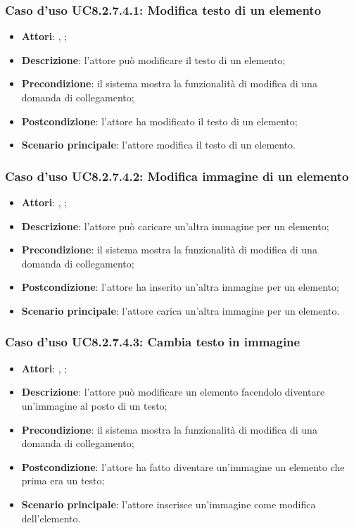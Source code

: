 		\subsubsection{Caso d'uso UC8.2.7.4.1: Modifica testo di un elemento}
		\label{UC8.2.7.4.1}
		\begin{itemize}
			\item \textbf{Attori}: \uau, \uaupro;
			\item \textbf{Descrizione}: l'attore può modificare il testo di un elemento;
			\item \textbf{Precondizione}: il sistema mostra la funzionalità di modifica di una domanda di collegamento; 
			\item \textbf{Postcondizione}: l'attore ha modificato il testo di un elemento;
			\item \textbf{Scenario principale}: l'attore modifica il testo di un elemento.  
		\end{itemize}
		
		\subsubsection{Caso d'uso UC8.2.7.4.2: Modifica immagine di un elemento}
		\label{UC8.2.7.4.2}
		\begin{itemize}
			\item \textbf{Attori}: \uau, \uaupro;
			\item \textbf{Descrizione}: l'attore può caricare un'altra immagine per un elemento;
			\item \textbf{Precondizione}: il sistema mostra la funzionalità di modifica di una domanda di collegamento; 
			\item \textbf{Postcondizione}: l'attore ha inserito un'altra immagine per un elemento;
			\item \textbf{Scenario principale}: l'attore carica un'altra immagine per un elemento.
		\end{itemize}
		
		\subsubsection{Caso d'uso UC8.2.7.4.3: Cambia testo in immagine}
		\label{UC8.2.7.4.3}
		\begin{itemize}
			\item \textbf{Attori}: \uau, \uaupro;
			\item \textbf{Descrizione}: l'attore può modificare un elemento facendolo diventare un'immagine al posto di un testo;
			\item \textbf{Precondizione}: il sistema mostra la funzionalità di modifica di una domanda di collegamento; 
			\item \textbf{Postcondizione}: l'attore ha fatto diventare un'immagine un elemento che prima era un testo;
			\item \textbf{Scenario principale}: l'attore inserisce un'immagine come modifica dell'elemento.  
		\end{itemize}
		
